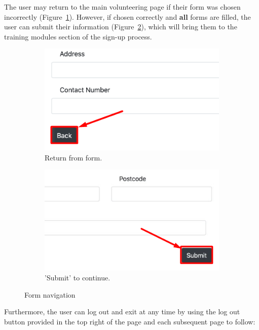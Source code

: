 \documentclass[12pt]{article}
\begin{document}
The user may return to the main volunteering page if their form was chosen incorrectly (Figure~\ref{fig7a}). However, if chosen correctly and \textbf{all} forms are filled, the user can submit their information (Figure~\ref{fig7b}), which will bring them to the training modules section of the sign-up process. 
\begin{figure}[h]
 
    \begin{subfigure}{0.515\textwidth}
    \includegraphics[width=0.9\linewidth]{main/Back.png} 
    \caption{Return from form.}
    \label{fig7a}
    \end{subfigure}
    \begin{subfigure}{0.5\textwidth}
    \includegraphics[width=0.9\linewidth]{main/submit.png}
    \caption{'Submit' to continue.}
    \label{fig7b}
    \end{subfigure}
 
\caption{Form navigation}
\label{fig7}
\end{figure}
\newpage
Furthermore, the user can log out and exit at any time by using the log out button provided in the top right of the page and each subsequent page to follow:
\end{document}
